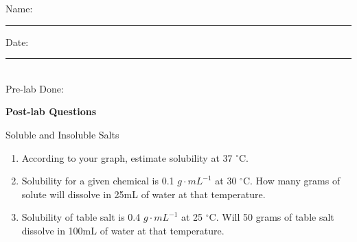 \documentclass[main.tex]{subfiles}
\begin{document}
\newpage
\begin{multicols}{2}
\begin{tcolorbox}[enhanced jigsaw,breakable,size=title,
colback=mybrown!05,colframe=black,fonttitle=\bfseries,
title=STUDENT INFO,pad at break=1mm, break at=15cm/0pt ]
\vspace{0.2cm}
\noindent Name: \rule{5cm}{0.4pt}Date:\rule{1cm}{0.4pt}\\
Pre-lab Done: \quad
\end{tcolorbox}
\end{multicols}
\hfill
\vspace{0.2cm}
\begin{center}
{\large \bfseries 
Post-lab Questions 
\par
\Huge
Soluble and Insoluble Salts
\\[5pt] \par}
\vspace{0.2cm}
\end{center}
\par
\noindent
\uline{  \hfill \normalsize \hfill       }
\begin{enumerate}
\item  According to your graph, estimate solubility at 37 $^\circ$C.
\vspace{3.7cm}
\item Solubility for a given chemical is 0.1 $g\cdot mL^{-1}$ at 30 $^\circ$C. How many grams of solute will dissolve in 25mL of water at that temperature.
\vspace{3.7cm}
\item Solubility of table salt is 0.4 $g\cdot mL^{-1}$ at 25 $^\circ$C. Will 50 grams of table salt dissolve in 100mL of water at that temperature.
\vspace{3.7cm}
\end{enumerate}

\clearpage\mbox{}\clearpage

 
\end{document}
